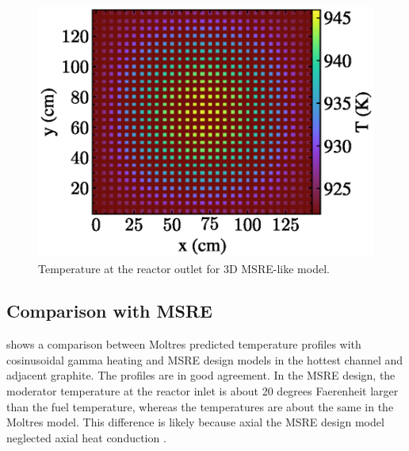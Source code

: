\documentclass{article}
\let\Oldsubsection\subsection
\renewcommand{\subsection}{\FloatBarrier\Oldsubsection}
\begin{document}
\begin{figure}[htpb]
  \centering
  \includegraphics{3d_gamma_heating_z_slice_temp.eps}
        \caption{Temperature at the reactor outlet for 3D \gls{MSRE}-like
          model.}
  \label{fig:3d_temp_fuel_outlet}
\end{figure}



\subsection{Comparison with \gls{MSRE}}

 shows a comparison between Moltres predicted temperature
profiles with cosinusoidal gamma heating and \gls{MSRE} design models
\cite{briggs_molten-salt_1964} in the hottest channel and adjacent graphite. The
profiles are in good agreement. In the \gls{MSRE} design, the moderator
temperature at the reactor inlet is about 20 degrees Faerenheit larger than the
fuel temperature, whereas the temperatures are about the same in the Moltres
model. This difference is likely because axial the \gls{MSRE} design model 
neglected axial heat conduction \cite[p. 99]{briggs_molten-salt_1964}.
\end{document}
